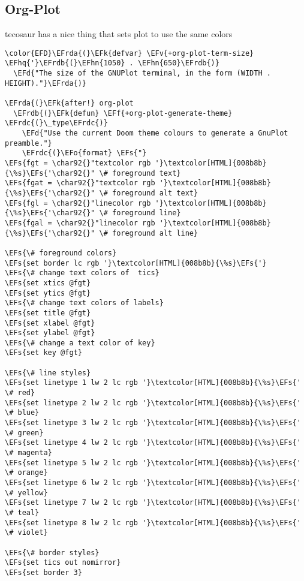 \documentclass{article}
\newcommand{\EFs}[1]{\textcolor{EFs}{#1}} %
\newcommand{\EFd}[1]{\textcolor{EFd}{#1}} %
\newcommand{\EFk}[1]{\textcolor{EFk}{#1}} %
\newcommand{\EFf}[1]{\textcolor{EFf}{#1}} %
\newcommand{\EFv}[1]{\textcolor{EFv}{#1}} %
\newcommand{\EFo}[1]{\textcolor{EFo}{#1}} %
\newcommand{\EFhn}[1]{\textcolor{EFhn}{\textbf{#1}}} %
\newcommand{\EFhq}[1]{#1} %
\newcommand{\EFrda}[1]{\textcolor{EFrda}{#1}} %
\newcommand{\EFrdb}[1]{\textcolor{EFrdb}{#1}} %
\newcommand{\EFrdc}[1]{\textcolor{EFrdc}{#1}} %
\begin{document}
\subsection{Org-Plot}
\label{sec:org1a3dd73}
tecosaur has a nice thing that sets plot to use the same colors
\begin{Code}
\begin{Verbatim}
\color{EFD}\EFrda{(}\EFk{defvar} \EFv{+org-plot-term-size} \EFhq{'}\EFrdb{(}\EFhn{1050} . \EFhn{650}\EFrdb{)}
  \EFd{"The size of the GNUPlot terminal, in the form (WIDTH . HEIGHT)."}\EFrda{)}

\EFrda{(}\EFk{after!} org-plot
  \EFrdb{(}\EFk{defun} \EFf{+org-plot-generate-theme} \EFrdc{(}\_type\EFrdc{)}
    \EFd{"Use the current Doom theme colours to generate a GnuPlot preamble."}
    \EFrdc{(}\EFo{format} \EFs{"}
\EFs{fgt = \char92{}"textcolor rgb '}\textcolor[HTML]{008b8b}{\%s}\EFs{'\char92{}" \# foreground text}
\EFs{fgat = \char92{}"textcolor rgb '}\textcolor[HTML]{008b8b}{\%s}\EFs{'\char92{}" \# foreground alt text}
\EFs{fgl = \char92{}"linecolor rgb '}\textcolor[HTML]{008b8b}{\%s}\EFs{'\char92{}" \# foreground line}
\EFs{fgal = \char92{}"linecolor rgb '}\textcolor[HTML]{008b8b}{\%s}\EFs{'\char92{}" \# foreground alt line}

\EFs{\# foreground colors}
\EFs{set border lc rgb '}\textcolor[HTML]{008b8b}{\%s}\EFs{'}
\EFs{\# change text colors of  tics}
\EFs{set xtics @fgt}
\EFs{set ytics @fgt}
\EFs{\# change text colors of labels}
\EFs{set title @fgt}
\EFs{set xlabel @fgt}
\EFs{set ylabel @fgt}
\EFs{\# change a text color of key}
\EFs{set key @fgt}

\EFs{\# line styles}
\EFs{set linetype 1 lw 2 lc rgb '}\textcolor[HTML]{008b8b}{\%s}\EFs{' \# red}
\EFs{set linetype 2 lw 2 lc rgb '}\textcolor[HTML]{008b8b}{\%s}\EFs{' \# blue}
\EFs{set linetype 3 lw 2 lc rgb '}\textcolor[HTML]{008b8b}{\%s}\EFs{' \# green}
\EFs{set linetype 4 lw 2 lc rgb '}\textcolor[HTML]{008b8b}{\%s}\EFs{' \# magenta}
\EFs{set linetype 5 lw 2 lc rgb '}\textcolor[HTML]{008b8b}{\%s}\EFs{' \# orange}
\EFs{set linetype 6 lw 2 lc rgb '}\textcolor[HTML]{008b8b}{\%s}\EFs{' \# yellow}
\EFs{set linetype 7 lw 2 lc rgb '}\textcolor[HTML]{008b8b}{\%s}\EFs{' \# teal}
\EFs{set linetype 8 lw 2 lc rgb '}\textcolor[HTML]{008b8b}{\%s}\EFs{' \# violet}

\EFs{\# border styles}
\EFs{set tics out nomirror}
\EFs{set border 3}


\end{Verbatim}
\end{Code}
\end{document}
